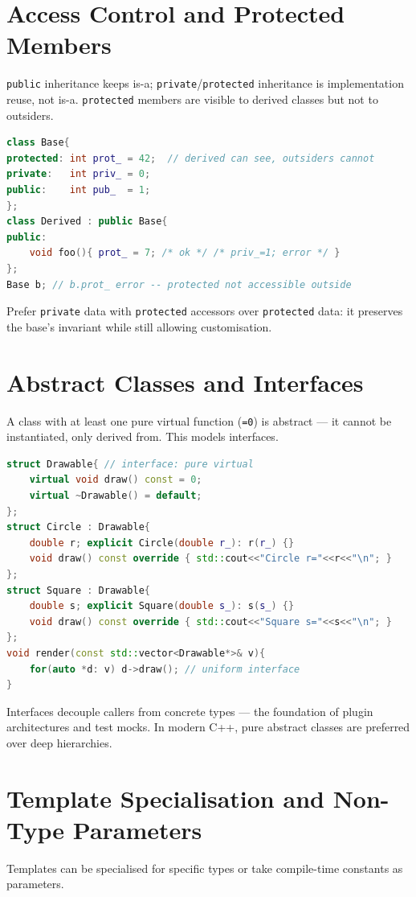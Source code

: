 \section{Access Control and Protected Members}
\texttt{public} inheritance keeps is-a; \texttt{private}/\texttt{protected} inheritance is implementation reuse, not is-a. \texttt{protected} members are visible to derived classes but not to outsiders.

\begin{lstlisting}[language=C++]
class Base{
protected: int prot_ = 42;  // derived can see, outsiders cannot
private:   int priv_ = 0;
public:    int pub_  = 1;
};
class Derived : public Base{
public:
    void foo(){ prot_ = 7; /* ok */ /* priv_=1; error */ }
};
Base b; // b.prot_ error -- protected not accessible outside
\end{lstlisting}
Prefer \texttt{private} data with \texttt{protected} accessors over \texttt{protected} data: it preserves the base's invariant while still allowing customisation.

\section{Abstract Classes and Interfaces}
A class with at least one pure virtual function (\texttt{=0}) is abstract --- it cannot be instantiated, only derived from. This models interfaces.

\begin{lstlisting}[language=C++]
struct Drawable{ // interface: pure virtual
    virtual void draw() const = 0;
    virtual ~Drawable() = default;
};
struct Circle : Drawable{
    double r; explicit Circle(double r_): r(r_) {}
    void draw() const override { std::cout<<"Circle r="<<r<<"\n"; }
};
struct Square : Drawable{
    double s; explicit Square(double s_): s(s_) {}
    void draw() const override { std::cout<<"Square s="<<s<<"\n"; }
};
void render(const std::vector<Drawable*>& v){
    for(auto *d: v) d->draw(); // uniform interface
}
\end{lstlisting}
Interfaces decouple callers from concrete types --- the foundation of plugin architectures and test mocks. In modern C++, pure abstract classes are preferred over deep hierarchies.


\section{Template Specialisation and Non-Type Parameters}
Templates can be specialised for specific types or take compile-time constants as parameters.

